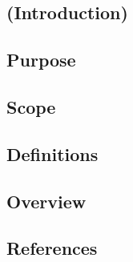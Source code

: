 \documentclass[journal,10pt,draftclsnofoot,onecolumn]{IEEEtran}
\begin{document}
\begin{singlespace}

\section{(Introduction)}

\subsection{Purpose}

\subsection{Scope}

\subsection{Definitions}

\subsection{Overview}

\subsection{References}
\nocite{*}




\end{singlespace}
\end{document}
